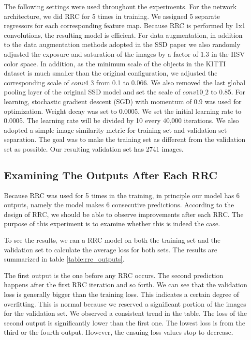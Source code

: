 \documentclass[10pt,twocolumn,letterpaper]{article}
\begin{document}
The following settings were used throughout the experiments. For the network architecture, we did RRC for 5 times in training. We assigned 5 separate regressors for each corresponding feature map. Because RRC is performed by 1x1 convolutions, the resulting model is efficient. For data augmentation, in addition to the data augmentation methods adopted in the SSD paper we also randomly adjusted the exposure and saturation of the images by a factor of 1.3 in the HSV color space. In addition, as the minimum scale of the objects in the KITTI dataset is much smaller than the original configuration, we adjusted the corresponding scale of $conv4\_3$ from 0.1 to 0.066. We also removed the last global pooling layer of the original SSD model and set the scale of $conv10\_2$ to 0.85. For learning, stochastic gradient descent (SGD) with momentum of 0.9 was used for optimization. Weight decay was set to 0.0005. We set the initial learning rate to 0.0005. The learning rate will be divided by 10 every 40,000 iterations. We also adopted a simple image similarity metric for training set and validation set separation. The goal was to make the training set as different from the validation set as possible. Our resulting validation set has 2741 images.

\subsection{Examining The Outputs After Each RRC}
Because RRC was used for 5 times in the training, in principle our model has 6 outputs, namely the model makes 6 consecutive predictions. According to the design of RRC, we should be able to observe improvements after each RRC. The purpose of this experiment is to examine whether this is indeed the case.

To see the results, we ran a RRC model on both the training set and the validation set to calculate the average loss for both sets. The results are summarized in table \ref{table:rrc_outputs}.

The first output is the one before any RRC occurs. The second prediction happens after the first RRC iteration and so forth. We can see that the validation loss is generally bigger than the training loss. This indicates a certain degree of overfitting. This is normal because we reserved a significant portion of the images for the validation set. We observed a consistent trend in the table. The loss of the second output is significantly lower than the first one. The lowest loss is from the third or the fourth output. However, the ensuing loss values stop to decrease. 
\end{document}
